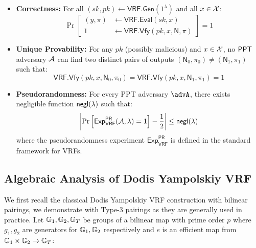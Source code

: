 \begin{itemize}
    \item \textbf{Correctness:} For all $(sk, pk) \gets \mathsf{VRF.Gen}(1^\lambda)$ and all $x \in \mathcal{X}$:
    \[
    \Pr\left[\begin{aligned}
        (y, \pi) &\gets \mathsf{VRF.Eval}(sk, x) \\
        1 &\gets \mathsf{VRF.Vfy}(pk, x, \textsf{N}, \pi)
    \end{aligned}\right] = 1
    \]

    \item \textbf{Unique Provability:} For any $pk$ (possibly malicious) and $x \in \mathcal{X}$, no $\mathsf{PPT}$ adversary $\mathcal{A}$ can find two distinct pairs of outputs $(\textsf{N}_0, \pi_0) \neq (\textsf{N}_1, \pi_1)$ such that:
    \[
    \mathsf{VRF.Vfy}(pk, x, \textsf{N}_0, \pi_0) = \mathsf{VRF.Vfy}(pk, x, \textsf{N}_1, \pi_1) = 1
    \]

    \item \textbf{Pseudorandomness:} For every PPT adversary $\advA$, there exists negligible function ${\mathsf{negl}(\lambda)}$ such that:
    \[
    \left|\Pr\left[\mathsf{Exp}_{\mathsf{VRF}}^{\mathsf{PR}}(\mathcal{A}, \lambda) = 1\right] - \frac{1}{2}\right| \leq {\mathsf{negl}(\lambda)}
    \]
    where the pseudorandomness experiment $\mathsf{Exp}_{\mathsf{VRF}}^{\mathsf{PR}}$ is defined in the standard framework for VRFs.
\end{itemize}


\subsection{Algebraic Analysis of Dodis Yampolskiy VRF}
We first recall the classical Dodis Yampolskiy VRF construction with bilinear pairings, we demonstrate with Type-3 pairings as they are generally used in practice. Let $\mathbb{G}_1, \mathbb{G}_2, \mathbb{G}_T$ be groups of a bilinear map with prime order $p$ where $g_1, g_2$ are generators for $\mathbb{G}_1, \mathbb{G}_2$ respectively and $e$ is an efficient map from $\mathbb{G}_1 \times \mathbb{G}_2 \to \mathbb{G}_T$:


